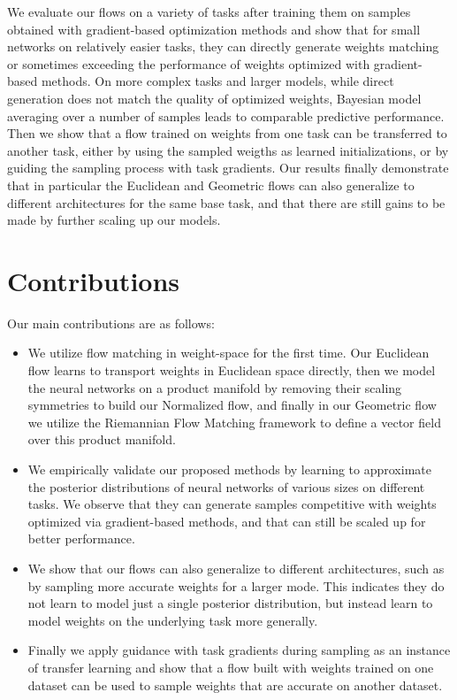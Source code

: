 We evaluate our flows on a variety of tasks after training them on samples obtained with gradient-based optimization methods and show that for small networks on relatively easier tasks, they can directly generate weights matching or sometimes exceeding the performance of weights optimized with gradient-based methods. On more complex tasks and larger models, while direct generation does not match the quality of optimized weights, Bayesian model averaging over a number of samples leads to comparable predictive performance. Then we show that a flow trained on weights from one task can be transferred to another task, either by using the sampled weigths as learned initializations, or by guiding the sampling process with task gradients. Our results finally demonstrate that in particular the Euclidean and Geometric flows can also generalize to different architectures for the same base task, and that there are still gains to be made by further scaling up our models. 

\section{Contributions}

Our main contributions are as follows:
\begin{itemize}
    \item We utilize flow matching in weight-space for the first time. Our Euclidean flow learns to transport weights in Euclidean space directly, then we model the neural networks on a product manifold by removing their scaling symmetries to build our Normalized flow, and finally in our Geometric flow we utilize the Riemannian Flow Matching framework to define a vector field over this product manifold. 
    \item We empirically validate our proposed methods by learning to approximate the posterior distributions of neural networks of various sizes on different tasks. We observe that they can generate samples competitive with weights optimized via gradient-based methods, and that can still be scaled up for better performance. 
    \item We show that our flows can also generalize to different architectures, such as by sampling more accurate weights for a larger mode. This indicates they do not learn to model just a single posterior distribution, but instead learn to model weights on the underlying task more generally. 
    \item Finally we apply guidance with task gradients during sampling as an instance of transfer learning and show that a flow built with weights trained on one dataset can be used to sample weights that are accurate on another dataset. 
\end{itemize}